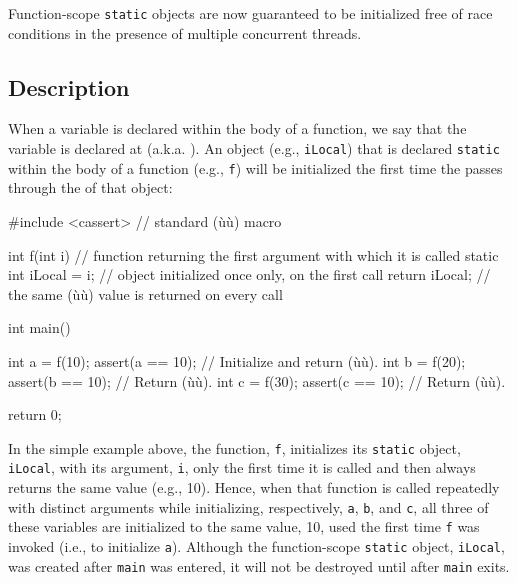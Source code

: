 


Function-scope \lstinline!static! objects are now guaranteed to be
initialized free of race conditions in the presence
of multiple concurrent threads.

\subsection[Description]{Description}\label{description-functionstatic}

When a variable is declared within the body of a function, we say that
the variable is declared at  (a.k.a.
). An object (e.g., \lstinline!iLocal!) that is
declared \lstinline!static! within the body of a function (e.g.,
\lstinline!f!) will be initialized the first time the  passes through the  of that object:

\begin{emcppslisting}
#include <cassert>  // standard (ù{}ù) macro

int f(int i) // function returning the first argument with which it is called
{
    static int iLocal = i;  // object initialized once only, on the first call
    return iLocal;          // the same (ù{}ù) value is returned on every call
}

int main()
{
    int a = f(10);  assert(a == 10);  // Initialize and return (ù{}ù).
    int b = f(20);  assert(b == 10);  // Return (ù{}ù).
    int c = f(30);  assert(c == 10);  // Return (ù{}ù).

    return 0;
}
\end{emcppslisting}

\noindent In the simple example above, the function, \lstinline!f!, initializes its
\lstinline!static! object, \lstinline!iLocal!, with its argument, \lstinline!i!, only
the first time it is called and then always returns the same value
(e.g., 10). Hence, when that function is called repeatedly with distinct
arguments while initializing, respectively, \lstinline!a!, \lstinline!b!, and
\lstinline!c!, all three of these variables are initialized to the same
value, 10, used the first time \lstinline!f! was invoked (i.e., to
initialize \lstinline!a!). Although the function-scope \lstinline!static!
object, \lstinline!iLocal!, was created after \lstinline!main! was entered, it
will not be destroyed until after \lstinline!main! exits.

